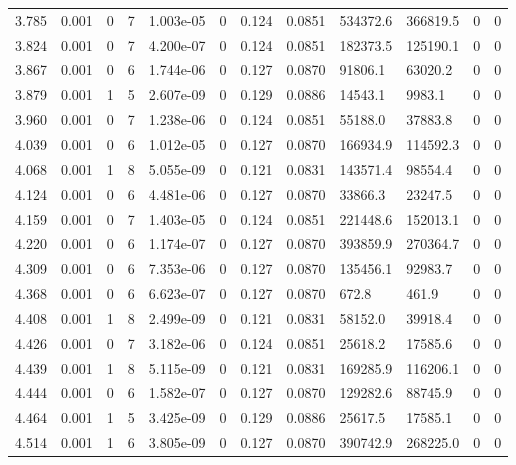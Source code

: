 \documentclass[preview]{standalone}
\begin{document}
{{{\begin{tabular}{L{1.2cm}C{1.2cm} C{0.3cm}C{0.5cm} C{1.4cm}C{1.4cm} C{1.4cm}C{1.4cm} C{1.6cm}C{1.6cm} C{1.6cm}C{1.6cm}}
  3.785  &  0.001  & 0     &  7 &  1.003e-05  & 0  &  0.124&   0.0851& 534372.6 & 366819.5   &  0 & 0  \\ 
  3.824  &  0.001  & 0     &  7 &  4.200e-07  & 0  &  0.124&   0.0851& 182373.5 & 125190.1   &  0 & 0  \\ 
  3.867  &  0.001  & 0     &  6 &  1.744e-06  & 0  &  0.127&   0.0870& 91806.1 & 63020.2   &  0 & 0  \\ 
  3.879  &  0.001  & 1     &  5 &  2.607e-09  & 0  &  0.129&   0.0886& 14543.1 & 9983.1   &  0 & 0  \\ 
  3.960  &  0.001  & 0     &  7 &  1.238e-06  & 0  &  0.124&   0.0851& 55188.0 & 37883.8   &  0 & 0  \\ 
  4.039  &  0.001  & 0     &  6 &  1.012e-05  & 0  &  0.127&   0.0870& 166934.9 & 114592.3   &  0 & 0  \\ 
  4.068  &  0.001  & 1     &  8 &  5.055e-09  & 0  &  0.121&   0.0831& 143571.4 & 98554.4   &  0 & 0  \\ 
  4.124  &  0.001  & 0     &  6 &  4.481e-06  & 0  &  0.127&   0.0870& 33866.3 & 23247.5   &  0 & 0  \\ 
  4.159  &  0.001  & 0     &  7 &  1.403e-05  & 0  &  0.124&   0.0851& 221448.6 & 152013.1   &  0 & 0  \\ 
  4.220  &  0.001  & 0     &  6 &  1.174e-07  & 0  &  0.127&   0.0870& 393859.9 & 270364.7   &  0 & 0  \\ 
  4.309  &  0.001  & 0     &  6 &  7.353e-06  & 0  &  0.127&   0.0870& 135456.1 & 92983.7   &  0 & 0  \\ 
  4.368  &  0.001  & 0     &  6 &  6.623e-07  & 0  &  0.127&   0.0870& 672.8 & 461.9   &  0 & 0  \\ 
  4.408  &  0.001  & 1     &  8 &  2.499e-09  & 0  &  0.121&   0.0831& 58152.0 & 39918.4   &  0 & 0  \\ 
  4.426  &  0.001  & 0     &  7 &  3.182e-06  & 0  &  0.124&   0.0851& 25618.2 & 17585.6   &  0 & 0  \\ 
  4.439  &  0.001  & 1     &  8 &  5.115e-09  & 0  &  0.121&   0.0831& 169285.9 & 116206.1   &  0 & 0  \\ 
  4.444  &  0.001  & 0     &  6 &  1.582e-07  & 0  &  0.127&   0.0870& 129282.6 & 88745.9   &  0 & 0  \\ 
  4.464  &  0.001  & 1     &  5 &  3.425e-09  & 0  &  0.129&   0.0886& 25617.5 & 17585.1   &  0 & 0  \\ 
  4.514  &  0.001  & 1     &  6 &  3.805e-09  & 0  &  0.127&   0.0870& 390742.9 & 268225.0   &  0 & 0  \\ 

\end{tabular}}}}
\end{document}
